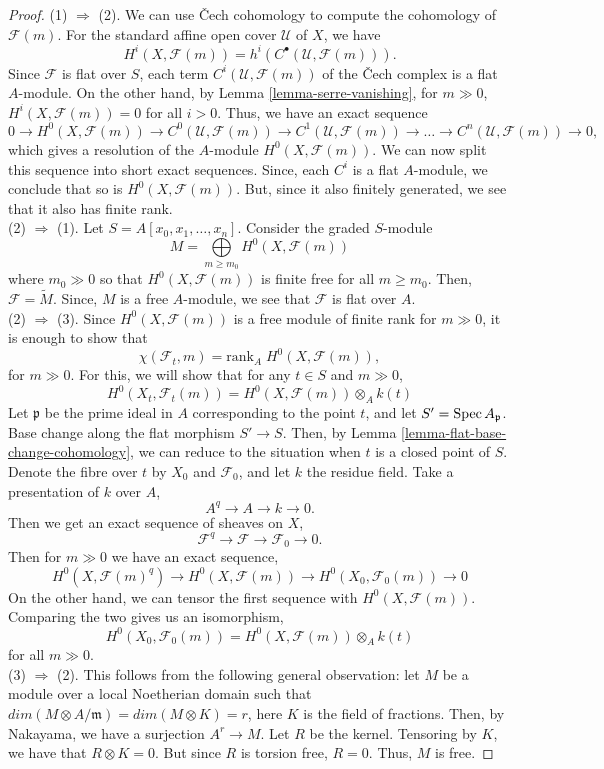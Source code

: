 \documentclass[11pt]{amsart}
\newcommand{\Spec}{{\rm Spec \,}}
\renewcommand{\tilde}{\widetilde}
\newcommand{\sF}{{\mathcal F}}
\newcommand{\sU}{{\mathcal U}}
\theoremstyle{definition}
\begin{document}
\begin{proof}
	(1) $\Rightarrow$ (2). We can use \v{C}ech cohomology to compute the cohomology of $\sF(m)$. For the standard affine open cover $\sU$ of $X$, we have
	\[H^i(X,\sF(m))=h^i(C^{\bullet}(\sU,\sF(m))).\]
	Since $\sF$ is flat over $S$, each term $C^{i}(\sU,\sF(m))$ of the \v{C}ech complex is a flat $A$-module. On the other hand, by Lemma \ref{lemma-serre-vanishing}, for $m\gg 0$, $H^i(X,\sF(m))=0$ for all $i>0$. Thus, we have an exact sequence
	\[0\rightarrow H^0(X,\sF(m))\rightarrow C^{0}(\sU,\sF(m))\rightarrow C^{1}(\sU,\sF(m))\rightarrow \ldots \rightarrow C^{n}(\sU,\sF(m))\rightarrow 0,\]
	which gives a resolution of the $A$-module $H^0(X,\sF(m))$. We can now split this sequence into short exact sequences. Since, each $C^i$ is a flat $A$-module, we conclude that so is $H^0(X,\sF(m))$. But, since it also finitely generated, we see that it also has finite rank.\\
	(2) $\Rightarrow$ (1). Let $S=A[x_0,x_1,\ldots,x_n]$. Consider the graded $S$-module
	\[M=\underset{m\geq m_0}{\bigoplus}H^0(X,\sF(m))\]
	where $m_0\gg 0$ so that $H^0(X,\sF(m))$ is finite free for all $m\geq m_0$. Then, $\sF=\tilde{M}$. Since, $M$ is a free $A$-module, we see that $\sF$ is flat over $A$.\\
	(2) $\Rightarrow$ (3). Since $H^0(X,\sF(m))$ is a free module of finite rank for $m\gg 0$, it is enough to show that
	\[\chi(\sF_t,m)=\text{rank}_A\; H^0(X,\sF(m)),\]
	for $m\gg 0$.	For this, we will show that for any $t\in S$ and $m\gg 0$,
	\[H^0(X_t,\sF_t(m))=H^0(X,\sF(m)) \otimes_A k(t)\]
	Let $\mathfrak{p}$ be the prime ideal in $A$ corresponding to the point $t$, and let $S'=\Spec A_{\mathfrak{p}}$. Base change along the flat morphism $S'\rightarrow S$. Then, by Lemma \ref{lemma-flat-base-change-cohomology}, we can reduce to the situation when $t$ is a closed point of $S$. Denote the fibre over $t$ by $X_0$ and $\sF_0$, and let $k$ the residue field. Take a presentation of $k$ over $A$,
	\[A^q\rightarrow A\rightarrow k\rightarrow 0.\]
	Then we get an exact sequence of sheaves on $X$,
	\[\sF^q\rightarrow \sF \rightarrow \sF_0\rightarrow 0.\]
	Then for $m\gg 0$ we have an exact sequence,
	\[H^0(X,\sF(m)^q)\rightarrow H^0(X,\sF(m))\rightarrow H^0(X_0,\sF_0(m)) \rightarrow 0\]
	On the other hand, we can tensor the first sequence with $H^0(X,\sF(m))$. Comparing the two gives us an isomorphism,
	\[H^0(X_0,\sF_0(m))=H^0(X,\sF(m)) \otimes_A k(t)\]
	for all $m\gg 0$.\\
	(3) $\Rightarrow$ (2). This follows from the following general observation: let $M$ be a module over a local Noetherian domain such that $dim (M\otimes A/\mathfrak{m})=dim (M\otimes K)= r$, here $K$ is the field of fractions. Then, by Nakayama, we have a surjection $A^r\rightarrow M$. Let $R$ be the kernel. Tensoring by $K$, we have that $R\otimes K=0$. But since $R$ is torsion free, $R =0$. Thus, $M$ is free.
\end{proof}
\end{document}
